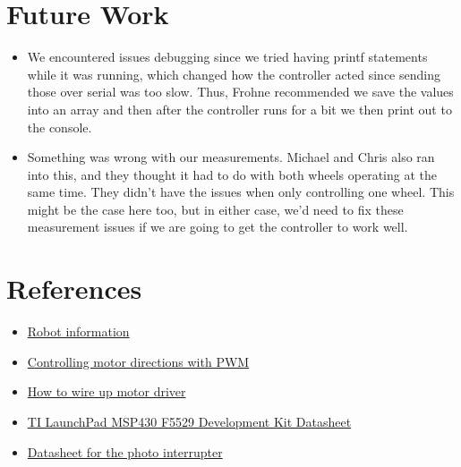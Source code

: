 \documentclass{article}
\begin{document}
\section{Future Work}
\begin{itemize}
\item We encountered issues debugging since we tried having printf statements while it was running, which changed how the controller acted since sending those over serial was too slow. Thus, Frohne recommended we save the values into an array and then after the controller runs for a bit we then print out to the console.
\item Something was wrong with our measurements. Michael and Chris also ran into this, and they thought it had to do with both wheels operating at the same time. They didn't have the issues when only controlling one wheel. This might be the case here too, but in either case, we'd need to fix these measurement issues if we are going to get the controller to work well.
\end{itemize}

\section{References}
\begin{itemize}
\item \href{http://fweb.wallawalla.edu/class-wiki/index.php/Assembly_Language_Programming#2015_Robot_Information}{Robot information}
\item \href{https://www.bananarobotics.com/shop/How-to-use-the-L298N-Dual-H-Bridge-Motor-Driver}{Controlling motor directions with PWM}
\item \href{http://www.instructables.com/id/Arduino-Modules-L298N-Dual-H-Bridge-Motor-Controll/?ALLSTEPS}{How to wire up motor driver}
\item \href{http://www.ti.com.cn/cn/lit/ug/slau533c/slau533c.pdf}{TI LaunchPad MSP430 F5529 Development Kit Datasheet}
\item \href{http://www.hyzt.com/manager/upimg/hy301\%E2\%80\%9407A.pdf}{Datasheet for the photo interrupter}
\end{itemize}
\end{document}
